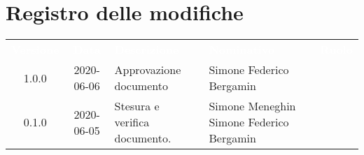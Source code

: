 \section*{Registro delle modifiche}
{
	\centering
	\begin{longtable}{ c c C{4cm}  C{4cm}  C{3cm} }
		\textcolor{white}{\textbf{Versione}} & \textcolor{white}{\textbf{Data}} & \textcolor{white}{\textbf{Descrizione}} & \textcolor{white}{\textbf{Nominativo}} & \textcolor{white}{\textbf{Ruolo}}\\		
		1.0.0 & 2020-06-06 & Approvazione documento & Simone Federico Bergamin &\RdP{}\\	
		0.1.0 & 2020-06-05 & Stesura e verifica documento. & Simone Meneghin \newline Simone Federico Bergamin &\reda{} \newline \ver{}\\		
		
	\end{longtable}

}